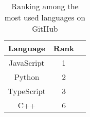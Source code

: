 \begin{table}[ht]
\centering
\caption{Ranking among the most used languages on GitHub \parencite{stateOfTheOctoverse23}}
\label{tab:githubMostUsedLanguageRanking23}
\begin{tabular}[t]{|c|c|c|}
\toprule
Language & Rank\\
\midrule
JavaScript & 1\\
Python & 2\\
TypeScript & 3\\
C++ & 6\\
\bottomrule
\end{tabular}
\end{table}
